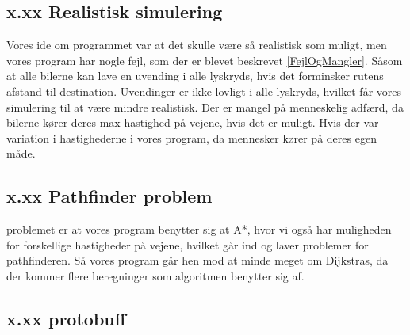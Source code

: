 \subsection{x.xx Realistisk simulering}
Vores ide om programmet var at det skulle være så realistisk som muligt, men vores program har nogle fejl, som der er blevet beskrevet \ref{FejlOgMangler}. Såsom at alle bilerne kan lave en uvending i alle lyskryds, hvis det forminsker rutens afstand til destination. Uvendinger er ikke lovligt i alle lyskryds, hvilket får vores simulering til at være mindre realistisk. Der er mangel på menneskelig adfærd, da bilerne kører deres max hastighed på vejene, hvis det er muligt. Hvis der var variation i hastighederne i vores program, da mennesker kører på deres egen måde.

\subsection{x.xx Pathfinder problem}
problemet er at vores program benytter sig at A*, hvor vi også har muligheden for forskellige hastigheder på vejene, hvilket går ind og laver problemer for pathfinderen. Så vores program går hen mod at minde meget om Dijkstras, da der kommer flere beregninger som algoritmen benytter sig af.


\subsection{x.xx protobuff}



